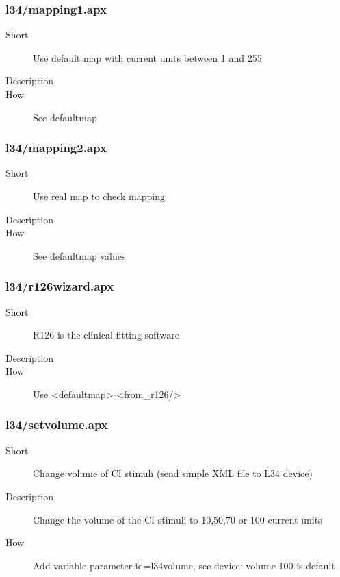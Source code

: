 \subsubsection{l34/mapping1.apx}
\begin{description}
\item[Short] 
 Use default map with current units between 1 and 255
\item[Description] 

\item[How] 
 See defaultmap
\end{description}

\subsubsection{l34/mapping2.apx}
\begin{description}
\item[Short] 
 Use real map to check mapping
\item[Description] 

\item[How] 
 See defaultmap values
\end{description}

\subsubsection{l34/r126wizard.apx}
\begin{description}
\item[Short] 
 R126 is the clinical fitting software
\item[Description] 

\item[How] 
 Use \textless{}defaultmap\textgreater{} \textless{}from\_r126/\textgreater{}
\end{description}

\subsubsection{l34/setvolume.apx}
\begin{description}
\item[Short] 
 Change volume of CI stimuli (send simple XML file to L34 device)
\item[Description] 
 Change the volume of the CI stimuli to 10,50,70 or 100 current units
\item[How] 
 Add variable parameter id=l34volume, see device: volume 100 is default
\end{description}

